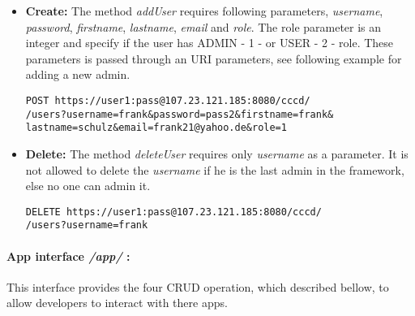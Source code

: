 \begin{itemize}
\item \textbf{Create:} The method \textit{addUser} requires following parameters, \textit{username}, \textit{password}, \textit{firstname}, \textit{lastname}, \textit{email} and \textit{role}.  The role parameter is an integer and specify if the user has ADMIN - 1 - or USER - 2 - role. These parameters is passed through an URI parameters, see following example for adding a new admin.

\begin{code}
\begin{verbatim}
POST https://user1:pass@107.23.121.185:8080/cccd/
/users?username=frank&password=pass2&firstname=frank&
lastname=schulz&email=frank21@yahoo.de&role=1
\end{verbatim}
\end{code}

\item \textbf{Delete:} The method \textit{deleteUser} requires only \textit{username} as a parameter. It is not allowed to delete the \textit{username} if he is the last admin in the framework, else no one can admin it.

\begin{code}
\begin{verbatim}
DELETE https://user1:pass@107.23.121.185:8080/cccd/
/users?username=frank
\end{verbatim}
\end{code}

\end{itemize}


\paragraph{App interface \textit{/app/} :} This interface provides the four CRUD operation, which described bellow, to allow developers to interact with there apps.

